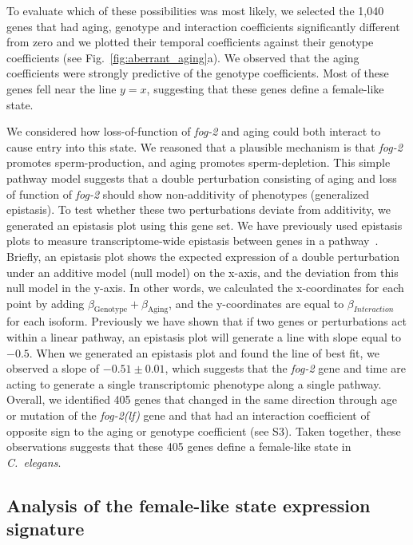 \documentclass[9pt,twocolumn,twoside]{gsag3jnl}
\newcommand{\cel}{\emph{C.~elegans}}
\newcommand{\fog}{\emph{\mbox{fog-2(lf)}}}
\newcommand{\gene}[1]{\emph{\mbox{#1}}}
\newcommand{\intersectn}{1,040}
\newcommand{\femalen}{405}
\begin{document}
To evaluate which of these possibilities was most likely, we selected the
\intersectn{} genes that had aging, genotype and interaction coefficients
significantly different from zero and we plotted their temporal coefficients
against their genotype coefficients (see Fig.~\ref{fig:aberrant_aging}a). We
observed that the aging coefficients were strongly predictive of the genotype
coefficients. Most of these genes fell near the line $y=x$, suggesting that
these genes define a female-like state.

We considered how loss-of-function of \gene{fog-2} and aging could both interact
to cause entry into this state. We reasoned that a plausible mechanism is that
\gene{fog-2} promotes sperm-production, and aging promotes sperm-depletion. This
simple pathway model suggests that a double perturbation consisting of aging and
loss of function of \gene{fog-2} should show non-additivity of phenotypes
(generalized epistasis). To test whether these two perturbations deviate from
additivity, we generated an epistasis plot using this gene set. We
have previously used epistasis plots to measure transcriptome-wide epistasis
between genes in a pathway~\citep{Angeles2017}. Briefly, an epistasis
plot shows the expected expression of a double perturbation under an additive
model (null model) on the x-axis, and the deviation from this null model in the
y-axis. In other words, we calculated the x-coordinates for each point by adding
$\beta_\mathrm{Genotype} + \beta_\mathrm{Aging}$, and the y-coordinates are
equal to $\beta_{Interaction}$ for each isoform. Previously we have shown that
if two genes or perturbations act within a linear pathway, an epistasis plot
will generate a line with slope equal to $-0.5$. When we generated an epistasis
plot and found the line of best fit, we observed a slope of $-0.51\pm 0.01$,
which suggests that the \gene{fog-2} gene and time are acting to generate a
single transcriptomic phenotype along a single pathway. Overall, we identified
\femalen{} genes that changed in the same direction through age or mutation of
the \fog{} gene and that had an interaction coefficient of opposite sign to the
aging or genotype coefficient (see S3). Taken together, these observations
suggests that these \femalen{} genes define a female-like state in \cel{}.

\subsection*{Analysis of the female-like state expression signature}
\end{document}
